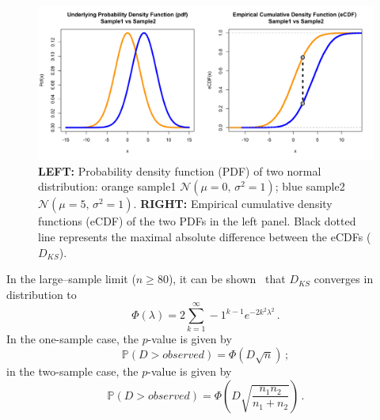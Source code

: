 \documentclass[codesnippet]{jss}
\begin{document}
\begin{figure}[t!]
\centering
\includegraphics{pdfvsCDF}
\caption{\label{fig:kstest1D} \textbf{LEFT:} Probability density function (PDF) of two normal distribution: orange sample1 $\mathcal{N}(\mu = 0,\,\sigma^{2} = 1)$; blue sample2 $\mathcal{N}(\mu = 5,\,\sigma^{2} = 1)$. \textbf{RIGHT:} Empirical cumulative density functions (eCDF) of the two PDFs in the left panel. Black dotted line represents the maximal absolute difference between the eCDFs ($D_{KS}$).
}
\end{figure}


In the large--sample limit ($n \geq 80$), it can be shown~\citep{Kendall1946} that $D_{KS}$ converges in distribution to 
\begin{equation} \label{eq:1}
\Phi(\lambda) = 2 \sum_{k=1}^{\infty} -1^{k-1}e^{-2k^2\lambda^2} \,.
\end{equation}
%
In the one-sample case, the $p$-value is given by 
\begin{equation} \label{eq:2}
\mathbb{P}(D > observed) = \Phi ( D\sqrt{n})\,;
\end{equation}
in the two-sample case, the $p$-value is given by
%
\begin{equation} \label{eq:3}
\mathbb{P}(D > observed) = \Phi ( D\sqrt{\frac{n_1n_2}{n_1+n_2}})\,.
\end{equation}
%
\end{document}
